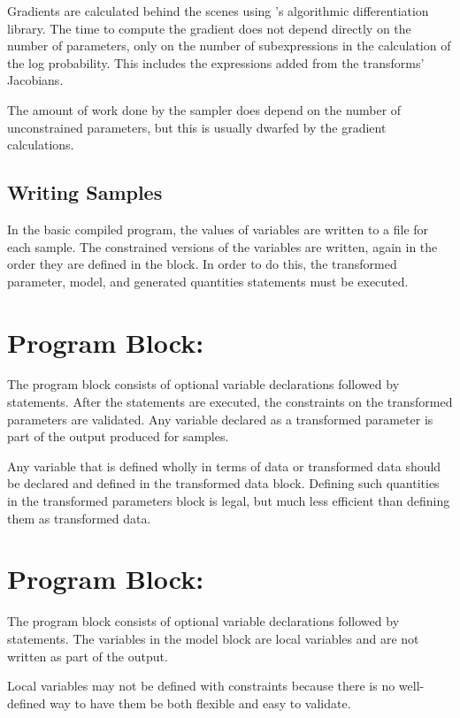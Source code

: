 Gradients are calculated behind the scenes using \Stan's algorithmic
differentiation library.  The time to compute the gradient does not
depend directly on the number of parameters, only on the number of
subexpressions in the calculation of the log probability.  This
includes the expressions added from the transforms' Jacobians.  

The amount of work done by the sampler does depend on the number of
unconstrained parameters, but this is usually dwarfed by the gradient
calculations.

\subsection{Writing Samples}

In the basic \Stan compiled program, the values of variables are
written to a file for each sample.  The constrained versions of the
variables are written, again in the order they are defined in the
 block.  In order to do this, the transformed
parameter, model, and generated quantities statements must be
executed.  


\section{Program Block: }

The  program block consists of optional
variable declarations followed by statements.  After the statements
are executed, the constraints on the transformed parameters are
validated.  Any variable declared as a transformed parameter is part
of the output produced for samples.

Any variable that is defined wholly in terms of data or transformed
data should be declared and defined in the transformed data block.
Defining such quantities in the transformed parameters block is legal,
but much less efficient than defining them as transformed data.

\section{Program Block: }

The  program block consists of optional variable
declarations followed by statements.  The variables in the model block
are local variables and are not written as part of the output.  

Local variables may not be defined with constraints because there is
no well-defined way to have them be both flexible and easy to
validate.

